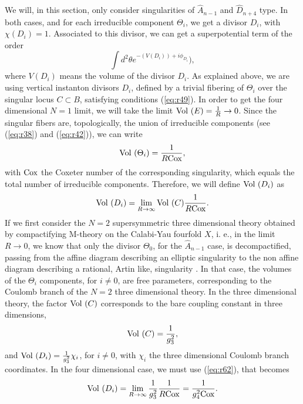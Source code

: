We will, in this section, only consider singularities of
$\hat{A}_{n-1}$ and $\hat{D}_{n+4}$ type. In both cases, and for
each irreducible component $\Theta_i$, we get a divisor $D_i$,
with $\chi(D_i)=1$. Associated to this divisor, we can get a
superpotential term of the order \cite{Wsp}
\begin{equation}
\int d^2 \theta e^{-(V(D_i))+ i \phi_{D_i}}),
\label{eq:r60}
\end{equation}
where $V(D_i)$ means the volume of the divisor $D_i$. As
explained above, we are using vertical instanton divisors $D_i$,
defined by a trivial fibering of $\Theta_i$ over the singular
locus $C \subset B$, satisfying conditions (\ref{eq:r49}). In
order to get the four dimensional $N=1$ limit, we will take the
limit $\hbox {Vol }(E)=\frac {1}{R} \rightarrow 0$. Since the
singular fibers are, topologically, the union of irreducible
components (see (\ref{eq:r38}) and (\ref{eq:r42})), we can write
\begin{equation}
\hbox {Vol }(\Theta_i) = \frac {1}{R \hbox {Cox}},
\label{eq:r61}
\end{equation}
with $\hbox {Cox}$ the Coxeter number of the corresponding
singularity, which equals the total number of irreducible
components. Therefore, we will define $\hbox {Vol }(D_i)$ as
\begin{equation}
\hbox {Vol }(D_i) = \lim_{R \rightarrow \infty} \hbox {Vol }(C)
\frac {1}{R \hbox {Cox}}.
\label{eq:r62}
\end{equation}
If we first consider the $N=2$ supersymmetric three dimensional
theory obtained by compactifying M-theory on the Calabi-Yau
fourfold $X$, i. e., in the limit $R \rightarrow 0$, we know that
only the divisor $\Theta_0$, for the $\hat{A}_{n-1}$ case, is decompactified, passing from the
affine diagram describing an elliptic singularity to the non
affine diagram describing a rational, Artin like, singularity \cite{Artin}. In
that case, the volumes of the $\Theta_i$ components, for $i \neq
0$, are free parameters, corresponding to the Coulomb branch of
the $N=2$ three dimensional theory. In the three dimensional
theory, the factor $\hbox{Vol }(C)$ corresponds to the bare
coupling constant in three dimensions,
\begin{equation}
\hbox {Vol }(C)= \frac {1}{g_3^2},
\label{eq:r63}
\end{equation}
and $\hbox {Vol }(D_i)= \frac {1}{g_3^2} \chi_i$, for $i \neq 0$,
with $\chi_i$ the three dimensional Coulomb branch coordinates.
In the four dimensional case, we must use (\ref{eq:r62}), that
becomes
\begin{equation}
\hbox {Vol }(D_i) = \lim_{R \rightarrow \infty} \frac {1}{g_3^2}
\frac {1}{R \hbox {Cox}} = \frac {1}{g_4^2 \hbox {Cox}}.
\label{eq:r64}
\end{equation}
  
